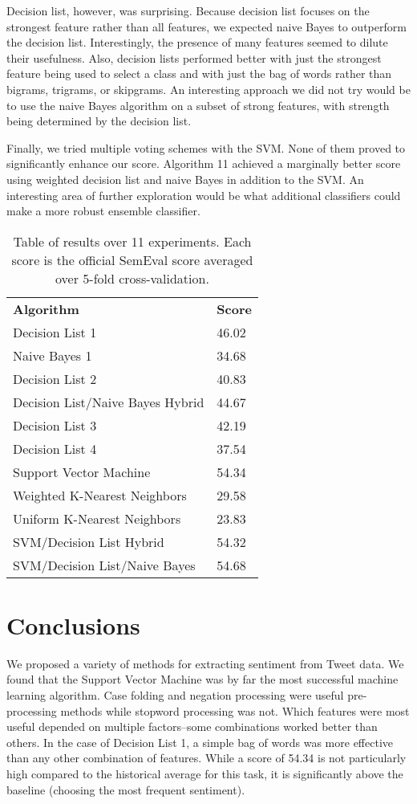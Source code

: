 \documentclass[11pt,letterpaper]{article}
\begin{document}
Decision list, however, was surprising. Because decision list focuses on the strongest feature rather than all features, we expected naive Bayes to outperform the decision list. Interestingly, the presence of many features seemed to dilute their usefulness. Also, decision lists performed better with just the strongest feature being used to select a class and with just the bag of words rather than bigrams, trigrams, or skipgrams. An interesting approach we did not try would be to use the naive Bayes algorithm on a subset of strong features, with strength being determined by the decision list. 

Finally, we tried multiple voting schemes with the SVM. None of them proved to significantly enhance our score. Algorithm 11 achieved a marginally better score using weighted decision list and naive Bayes in addition to the SVM. An interesting area of further exploration would be what additional classifiers could make a more robust ensemble classifier.

\begin{table}[ht]
\begin{center}
\begin{tabular}{|l| l|}
\hline \bf Algorithm & \bf Score \\ 
Decision List 1 & 46.02 \\
Naive Bayes 1& 34.68 \\
Decision List 2 &40.83 \\
Decision List/Naive Bayes Hybrid& 44.67\\
Decision List 3& 42.19\\
Decision List 4& 37.54 \\
Support Vector Machine& 54.34\\
Weighted K-Nearest Neighbors& 29.58\\
Uniform K-Nearest Neighbors& 23.83\\
SVM/Decision List Hybrid& 54.32\\
SVM/Decision List/Naive Bayes& 54.68\\
\hline
\end{tabular}
\end{center}
\caption{\label{font-table} Table of results over 11 experiments. Each score is the official SemEval score averaged over 5-fold cross-validation. }
\end{table}

\section{Conclusions}
We proposed a variety of methods for extracting sentiment from Tweet data. We found that the Support Vector Machine was by far the most successful machine learning algorithm. Case folding and negation processing were useful pre-processing methods while stopword processing was not. Which features were most useful depended on multiple factors--some combinations worked better than others. In the case of Decision List 1, a simple bag of words was more effective than any other combination of features. While a score of 54.34 is not particularly high compared to the historical average for this task, it is significantly above the baseline (choosing the most frequent sentiment). 
\end{document}
